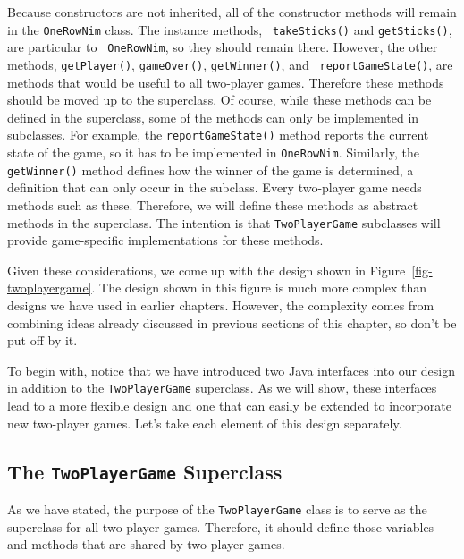 Because constructors are not inherited, all of the constructor methods
will remain in the {\tt OneRowNim} class. The instance methods, {\tt
takeSticks()} and {\tt getSticks()}, are particular to {\tt
OneRowNim}, so they should remain there. However, the other methods,
{\tt getPlayer()}, {\tt gameOver()}, {\tt getWinner()}, and {\tt
reportGameState()}, are methods that would be useful to all two-player
games. Therefore these methods should be moved up to the superclass.
Of course, while these methods can be defined in the superclass, some
of the methods can only be implemented in subclasses.  For example,
the {\tt reportGameState()} method reports the current state of the
game, so it has to be implemented in {\tt OneRowNim}. Similarly, the
{\tt getWinner()} method defines how the winner of the game is
determined, a definition that can only occur in the subclass. Every
two-player game needs methods such as these. Therefore, we will define
these methods as abstract methods in the superclass.  The intention is
that {\tt TwoPlayerGame} subclasses will provide game-specific
implementations for these methods.

Given these considerations, we come up with the design shown in
Figure~\ref{fig-twoplayergame}.  The design shown in this figure
is much more complex than designs we have used in earlier chapters.
However, the complexity comes from combining ideas already
discussed in previous sections of this chapter, so don't be put
off by it.

\begin{figure}[h!]
\end{figure}

To begin with, notice that we have introduced two Java interfaces into
our design in addition to the {\tt TwoPlayerGame} superclass.  As we
will show, these interfaces lead to a more flexible design and one
that can easily be extended to incorporate new two-player games. Let's
take each element of this design separately.

\subsection{The {\tt TwoPlayerGame} Superclass}

As we have stated, the purpose of the {\tt TwoPlayerGame} class is to
serve as the superclass for all two-player games. Therefore, it should
define those variables and methods that are shared by
two-player games. 

